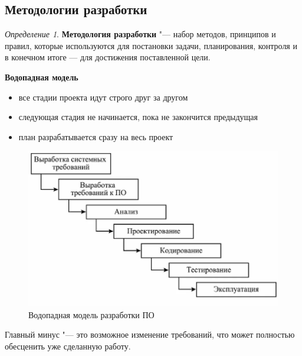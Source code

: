 \documentclass[bachelor, och, pract]{SCWorks}
\theoremstyle{remark}
\newtheorem{definition}{Определение}
\begin{document}
    
    \subsection{Методологии разработки}

    \begin{definition}
        \textbf{Методология разработки} "--- набор методов, принципов и правил, которые используются для постановки задачи, планирования, контроля и в конечном итоге — для достижения поставленной цели. 
    \end{definition}


    \begin{center}
        \textbf{Водопадная модель}    
    \end{center}

    \begin{itemize}[label=$\bullet$]
        \item все стадии проекта идут строго друг за другом
        \item следующая стадия не начинается, пока не закончится предыдущая
        \item план разрабатывается сразу на весь проект
    \end{itemize}

    \begin{figure}[H]
        \begin{center}
            \includegraphics[scale=0.5]{res/waterfall.png}
            \caption{Водопадная модель разработки ПО}
        \end{center}
    \end{figure}

    Главный минус "--- это возможное изменение требований, что может полностью обесценить уже сделанную работу.
\end{document}

